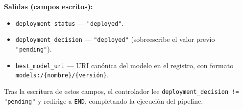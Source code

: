\textbf{Salidas (campos escritos):}
\begin{itemize}
  \item \texttt{deployment\_status} — \texttt{"deployed"}.
  \item \texttt{deployment\_decision} — \texttt{"deployed"} (sobreescribe el valor previo \texttt{"pending"}).
  \item \texttt{best\_model\_uri} — URI canónica del modelo en el registro, con formato \texttt{models:/\{nombre\}/\{versión\}}.
\end{itemize}

Tras la escritura de estos campos, el controlador lee \texttt{deployment\_decision != "pending"} y redirige a \texttt{END}, completando la ejecución del pipeline.
